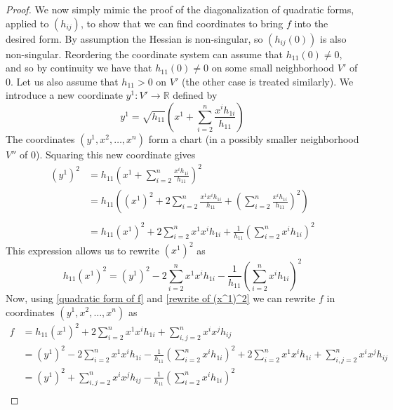 \begin{proof}
We now simply mimic the proof of the diagonalization of quadratic forms, applied to $(h_{ij})$, to show that we can find coordinates to bring $f$ into the desired form. By assumption the Hessian is non-singular, so $(h_{ij}(0))$ is also non-singular. Reordering the coordinate system can assume that $h_{11}(0) \neq 0$, and so by continuity we have that $h_{11}(0) \neq 0$ on some small neighborhood $V'$ of $0$. Let us also assume that $h_{11} > 0$ on $V'$ (the other case is treated similarly). We introduce a new coordinate $y^1 : V' \rightarrow \mathbb R$ defined by
\begin{equation}
\label{new coordinate}
y^1 = \sqrt{h_{11}} \left( x^1 + \sum_{i=2}^n \frac{x^i h_{1i}}{h_{11}} \right)
\end{equation}
The coordinates $(y^1,x^2,\ldots,x^n)$ form a chart (in a possibly smaller neighborhood $V''$ of $0$). Squaring this new coordinate gives
\begin{equation}
\label{square of new coordinate}
\begin{array}{rl}
	(y^1)^2 &= \displaystyle h_{11} \left( x^1 + \sum_{i=2}^n \frac{x^i h_{1i}}{h_{11}} \right)^2 \\
	        &= \displaystyle h_{11} \left( (x^1)^2 + 2 \sum_{i=2}^n \frac{x^1 x^i h_{1i}}{h_{11}} + \left( \sum_{i=2}^n \frac{x^i h_{1i}}{h_{11}} \right)^2 \right) \\
	        & \\
	        &= \displaystyle h_{11} (x^1)^2 + 2 \sum_{i=2}^n x^1 x^i h_{1i} + \frac{1}{h_{11}} \left( \sum_{i=2}^n x^i h_{1i} \right)^2 
\end{array}
\end{equation}
This expression allows us to rewrite $(x^1)^2$ as
\begin{equation}
\label{rewrite of (x^1)^2}
h_{11} (x^1)^2 = (y^1)^2 - 2 \sum_{i=2}^n x^1 x^i h_{1i} - \frac{1}{h_{11}} \left( \sum_{i=2}^n x^i h_{1i} \right)^2 
\end{equation}
Now, using \eqref{quadratic form of f} and \eqref{rewrite of (x^1)^2} we can rewrite $f$ in coordinates $(y^1,x^2,\ldots,x^n)$ as
\begin{align*}
	f &= h_{11} (x^1)^2 + 2 \sum_{i=2}^n x^1 x^i h_{1i} + \sum_{i,j=2}^n x^i x^j h_{ij} \\
	  &= (y^1)^2 - 2 \sum_{i=2}^n x^1 x^i h_{1i} - \frac{1}{h_{11}} \left( \sum_{i=2}^n x^i h_{1i} \right)^2 + 2 \sum_{i=2}^n x^1 x^i h_{1i} + \sum_{i,j=2}^n x^i x^j h_{ij} \\
	  &= (y^1)^2 + \sum_{i,j=2}^n x^i x^j h_{ij} - \frac{1}{h_{11}} \left( \sum_{i=2}^n x^i h_{1i} \right)^2 \\

\end{align*}
\end{proof}
